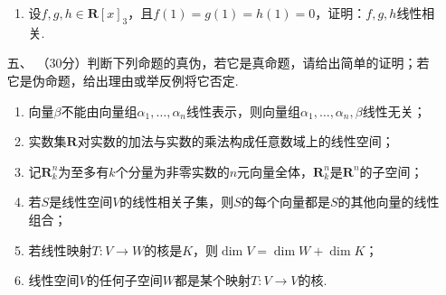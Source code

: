 \begin{enumerate}
\begin{enumerate}[label=(\arabic*)]
        \item 设$f,g,h\in\mathbf{R}[x]_3$，且$f(1)=g(1)=h(1)=0$，证明：$f,g,h$线性相关.
    \end{enumerate}
	\item[五、]（30分）判断下列命题的真伪，若它是真命题，请给出简单的证明；若它是伪命题，给出理由或举反例将它否定.
    \begin{enumerate}[label=(\arabic*)]
        \item 向量$\beta$不能由向量组$\alpha_1,\ldots,\alpha_n$线性表示，则向量组$\alpha_1,\ldots,\alpha_n,\beta$线性无关；

        \item 实数集$\mathbf{R}$对实数的加法与实数的乘法构成任意数域上的线性空间；

        \item 记$\mathbf{R}_k^n$为至多有$k$个分量为非零实数的$n$元向量全体，$\mathbf{R}_k^n$是$\mathbf{R}^n$的子空间；

        \item 若$S$是线性空间$V$的线性相关子集，则$S$的每个向量都是$S$的其他向量的线性组合；

        \item 若线性映射$T:V\to W$的核是$K$，则$\dim V=\dim W+\dim K$；

        \item 线性空间$V$的任何子空间$W$都是某个映射$T:V\to V$的核.
    \end{enumerate}
\end{enumerate}

\clearpage
